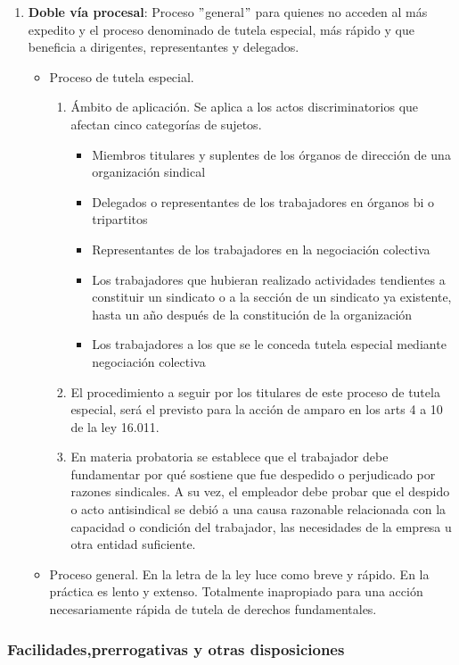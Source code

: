 \documentclass[spanish,12pt,a4paper,titlepage]{report}
\begin{document}
\begin{enumerate}
\item \textbf{Doble vía procesal}: Proceso $"$general$"$ para quienes no acceden al más expedito y el proceso denominado de tutela especial, más rápido y que beneficia a dirigentes, representantes y delegados. 
	\begin{itemize}
	\item Proceso de tutela especial.
		\begin{enumerate}
		\item Ámbito de aplicación. Se aplica a los actos discriminatorios que afectan cinco categorías de sujetos.
			\begin{itemize}
			\item Miembros titulares y suplentes de los órganos de dirección de una organización sindical
			\item Delegados o representantes de los trabajadores en órganos bi o tripartitos
			\item Representantes de los trabajadores en la negociación colectiva
			\item Los trabajadores que hubieran realizado actividades tendientes a constituir un sindicato o a la sección de un sindicato ya existente, hasta un año después de la constitución de la organización
			\item Los trabajadores a los que se le conceda tutela especial mediante negociación colectiva
			\end{itemize}
		\item El procedimiento a seguir por los titulares de este proceso de tutela especial, será el previsto para la acción de amparo en los arts 4 a 10 de la ley 16.011. 
		\item En materia probatoria se establece que el trabajador debe fundamentar por qué sostiene que fue despedido o perjudicado por razones sindicales. A su vez, el empleador debe probar que el despido o acto antisindical se debió a una causa razonable relacionada con la capacidad o condición del trabajador, las necesidades de la empresa u otra entidad suficiente. 
		\end{enumerate}
	\item Proceso general. En la letra de la ley luce como breve y rápido. En la práctica es lento y extenso. Totalmente inapropiado para una acción necesariamente rápida de tutela de derechos fundamentales. 
	\end{itemize}

\end{enumerate}

\subsubsection{Facilidades,prerrogativas y otras disposiciones}
\end{document}

